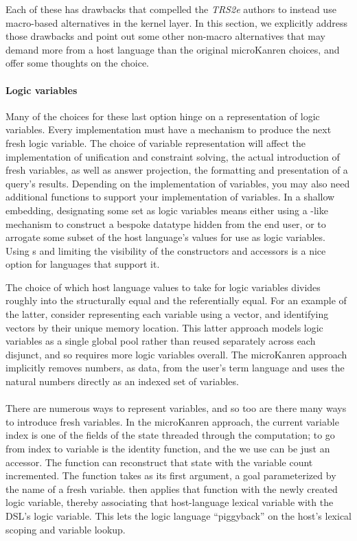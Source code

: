 \documentclass[sigplan,balance,pbalance,natbib=false]{acmart}
\begin{document}
Each of these has drawbacks that compelled the \emph{TRS2e} authors to
instead use macro-based alternatives in the kernel layer. In this
section, we explicitly address those drawbacks and point out some
other non-macro alternatives that may demand more from a host language
than the original microKanren choices, and offer some thoughts on the
choice.

\paragraph{Logic variables}

Many of the choices for these last option hinge on a representation of
logic variables. Every implementation must have a mechanism to produce
the next fresh logic variable. The choice of variable representation
will affect the implementation of unification and constraint solving,
the actual introduction of fresh variables, as well as answer
projection, the formatting and presentation of a query's results.
Depending on the implementation of variables, you may also need
additional functions to support your implementation of variables. In a
shallow embedding, designating some set as logic variables means
either using a -like mechanism to construct a
bespoke datatype hidden from the end user, or to arrogate some subset
of the host language's values for use as logic variables.
Using s and limiting the visibility of the
constructors and accessors is a nice option for languages that support
it.

The choice of which host language values to take for logic variables
divides roughly into the structurally equal and the referentially
equal. For an example of the latter, consider representing each
variable using a vector, and identifying vectors by their unique
memory location. This latter approach models logic variables as a
single global pool rather than reused separately across each disjunct,
and so requires more logic variables overall. The microKanren approach
implicitly removes numbers, as data, from the user's term language and
uses the natural numbers directly as an indexed set of variables.

\paragraph{}

There are numerous ways to represent variables, and so too are there
many ways to introduce fresh variables. In the microKanren approach,
the current variable index is one of the fields of the state threaded
through the computation; to go from index to variable is the identity
function, and the  we use can be just an
accessor. The function  can reconstruct that
state with the variable count incremented. The 
function takes as its first argument, a goal parameterized by the name
of a fresh variable.  then applies that
function with the newly created logic variable, thereby associating
that host-language lexical variable with the DSL's logic variable.
This lets the logic language \enquote{piggyback} on the host's lexical
scoping and variable lookup.
\end{document}
